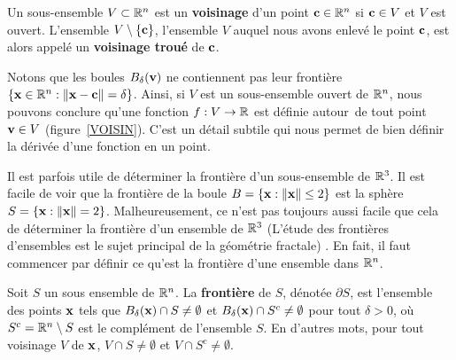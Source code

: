 {\begin{defn}
Un sous-ensemble $V \subset \mathbb{R}^n$ est un
{\bfseries voisinage} d'un
point $\mathbf{c} \in \mathbb{R}^n$ si $\mathbf{c} \in V$ et $V$ est ouvert.
L'ensemble $V\setminus \{\mathbf{c}\}$, l'ensemble $V$ auquel nous avons enlevé
le point $\mathbf{c}$, est alors appelé un
{\bfseries voisinage troué} de $\mathbf{c}$.
\end{defn}

Notons que les boules $B_\delta(\mathbf{v})$ ne contiennent pas leur
frontière $\{ \mathbf{x} \in \mathbb{R}^n : \|\mathbf{x}-\mathbf{c} \| = \delta \}$.
Ainsi, si $V$ est un sous-ensemble ouvert de $\mathbb{R}^n$, nous pouvons conclure
qu'une fonction $f:V\rightarrow \mathbb{R}$ est définie \flqq autour\frqq\ de
tout point $\mathbf{v} \in V$ (figure~\ref{VOISIN}).  C'est un
détail subtile qui nous permet de bien définir la dérivée
d'une fonction en un point.


Il est parfois utile de déterminer la frontière d'un sous-ensemble de
$\mathbb{R}^3$.  Il est facile de voir que la frontière de la boule
$B = \left\{ \mathbf{x} : \|\mathbf{x}\|\leq 2 \right\}$ est la sphère
$S = \left\{ \mathbf{x} : \|\mathbf{x}\|= 2 \right\}$.  Malheureusement, ce
n'est pas toujours aussi facile que cela de déterminer la frontière
d'un ensemble de $\mathbb{R}^3$ (L'étude des frontières d'ensembles est le
sujet principal de la géométrie fractale) .  En fait, il faut
commencer par définir ce qu'est la frontière d'une ensemble dans
$\mathbb{R}^n$.

\begin{defn}[+\theory]
Soit $S$ un sous ensemble de $\mathbb{R}^n$.  La {\bfseries frontière}
 de $S$, dénotée $\partial S$, est
l'ensemble des points $\mathbf{x}$ tels que
$B_{\delta}(\mathbf{x}) \cap S \neq \emptyset$ et
$B_{\delta}(\mathbf{x}) \cap S^c \neq \emptyset$ pour tout $\delta >0$,
où $S^c = \mathbb{R}^n \setminus S$ est le complément de l'ensemble $S$.  En
d'autres mots, pour tout voisinage $V$ de $\mathbf{x}$,
$V \cap S \neq \emptyset$ et $V \cap S^c \neq \emptyset$.
\end{defn}

}
